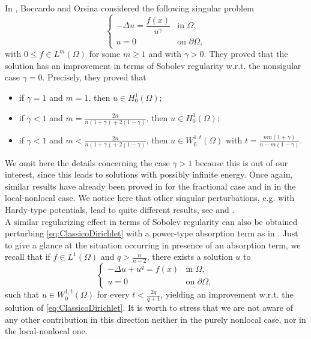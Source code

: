 \documentclass[11pt,a4paper]{amsart}
\theoremstyle{definition}
\theoremstyle{plain}
\numberwithin{equation}{section}
\begin{document}
\noindent In \cite{BO}, Boccardo and Orsina considered the following singular problem 
\begin{equation}\label{eq:BoccardoOrsina}
	\left\{\begin{array}{rl}
		-\Delta u = \dfrac{f(x)}{u^{\gamma}} & \textrm{in } \Omega,\\
		u=0 & \textrm{on } \partial \Omega,
	\end{array}\right.
\end{equation}
\noindent with $0\leq f \in L^{m}(\Omega)$ for some $m\geq 1$ and with $\gamma >0$. They proved that the solution has an improvement in terms of Sobolev regularity w.r.t. the nonsigular case $\gamma=0$. Precisely, they proved that
\begin{itemize}
	\item if $\gamma =1$ and $m=1$, then $u \in H^{1}_{0}(\Omega)$;
	\item if $\gamma <1$ and $m=\tfrac{2n}{n(1+\gamma)+2(1-\gamma)}$, then $u \in H^{1}_{0}(\Omega)$;
	\item if $\gamma <1$ and $m<\tfrac{2n}{n(1+\gamma)+2(1-\gamma)}$, then $u \in W^{1,t}_{0}(\Omega)$ with $t = \tfrac{nm(1+\gamma)}{n-m(1-\gamma)}$.
\end{itemize}
We omit here the details concerning the case $\gamma>1$ because this is out of our interest, since this leads to solutions with possibly infinite energy. Once again, similar results have already been proved in \cite{BdBMP, YoMa} for the fractional case and in \cite{ArRa} in the local-nonlocal case. We notice here that other singular perturbations, e.g. with Hardy-type potentials, lead to quite different results, see \cite{BOP} and \cite{BEMV}.\\
A similar regularizing effect in terms of Sobolev regularity can also be obtained perturbing \eqref{eq:ClassicoDirichlet} with a power-type absorption term as in \cite{BoGaVa, Cirmi}. Just to give a glance at the situation occurring in presence of an absorption term, we recall that if $f\in L^{1}(\Omega)$ and $q>\tfrac{n}{n-2}$, there exists a solution $u$ to 
\begin{equation}\label{eq:Boccardogallouet}
	\left\{\begin{array}{rl}
		-\Delta u + u^q = f(x) & \textrm{in } \Omega,\\
		u=0 & \textrm{on } \partial \Omega,
	\end{array}\right.
\end{equation}
\noindent such that $u \in W^{1,t}_{0}(\Omega)$ for every $t<\tfrac{2q}{q+1}$, yielding an improvement w.r.t. the solution of \eqref{eq:ClassicoDirichlet}. It is worth to stress that we are not aware of any other contribution in this direction neither in the purely nonlocal case, nor in the local-nonlocal one.\\
\end{document}
